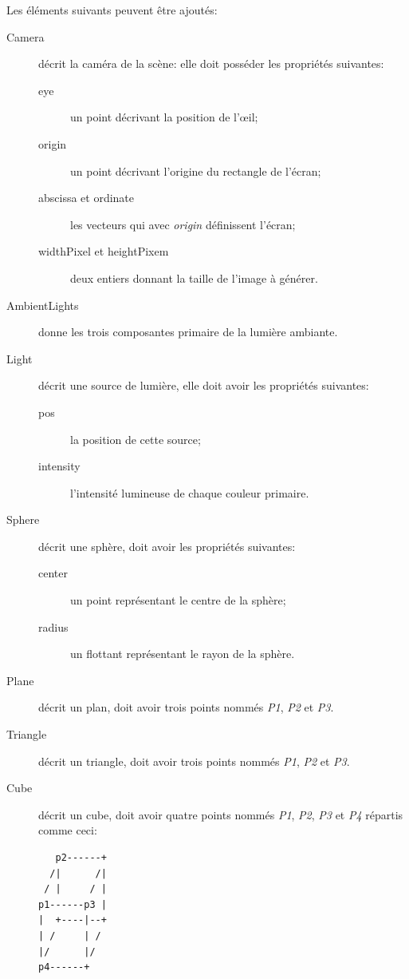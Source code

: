 \documentclass[a4paper]{article}
\begin{document}
    Les éléments suivants peuvent être ajoutés:
    \begin{description}
      \item[Camera] décrit la caméra de la scène: elle doit posséder les
        propriétés suivantes:
        \begin{description}
          \item[eye] un point décrivant la position de l'œil;
          \item[origin] un point décrivant l'origine du rectangle de l'écran;
          \item[abscissa et ordinate] les vecteurs qui avec \textit{origin}
            définissent l'écran;
          \item[widthPixel et heightPixem] deux entiers donnant la taille de
            l'image à générer. 
        \end{description}
      \item[AmbientLights] donne les trois composantes primaire de la lumière
        ambiante.
      \item[Light] décrit une source de lumière, elle doit avoir les propriétés
        suivantes:
        \begin{description}
          \item[pos] la position de cette source;
          \item[intensity] l'intensité lumineuse de chaque couleur primaire.
        \end{description}
      \item[Sphere] décrit une sphère, doit avoir les propriétés suivantes:
        \begin{description}
          \item[center] un point représentant le centre de la sphère;
          \item[radius] un flottant représentant le rayon de la sphère.
        \end{description}
      \item[Plane] décrit un plan, doit avoir trois points nommés \textit{P1},
        \textit{P2} et \textit{P3}.
      \item[Triangle] décrit un triangle, doit avoir trois points nommés
        \textit{P1}, \textit{P2} et \textit{P3}.
      \item[Cube] décrit un cube, doit avoir quatre points nommés
        \textit{P1}, \textit{P2}, \textit{P3} et \textit{P4} répartis comme
        ceci: \begin{lstlisting}
   p2------+
  /|      /|
 / |     / |
p1------p3 |
|  +----|--+
| /     | /
|/      |/
p4------+
        \end{lstlisting}
    \end{description}
\end{document}
